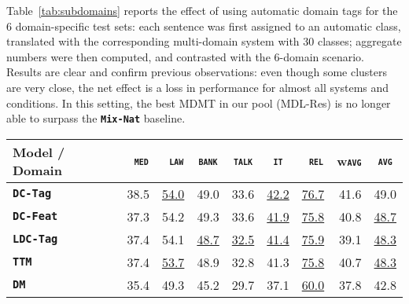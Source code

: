\documentclass[11pt,a4paper]{article}
\newcommand{\fyTodo}[1]{\Todo[FY:]{\textcolor{orange}{#1}}}
\newcommand{\fyDone}[1]{\done[FY]\Todo[FY:]{\textcolor{orange}{#1}}}
\newcommand{\domain}[1]{\texttt{\textsc{#1}}}
\newcommand{\system}[1]{\texttt{\textbf{#1}}}
\newcommand{\SB}[1]{\textbf{#1}}
\newcommand{\SW}[1]{\underline{#1}}
\begin{document}
Table~\ref{tab:subdomains} reports the effect of using automatic domain tags for the 6 domain-specific test sets: each sentence was first assigned to an automatic class, translated with the corresponding multi-domain system with 30 classes; aggregate numbers were then computed, and contrasted with the 6-domain scenario. Results are clear and confirm previous observations: even though some clusters are very close, the net effect is a loss in performance for almost all systems and conditions. In this setting, the best MDMT in our pool (MDL-Res) is no longer able to surpass the \system{Mix-Nat} baseline.%

\begin{table*}[t]
  \centering
  \fyDone{Fix column size}
  \begin{tabular}{|p{3cm}|*{8}{r|}} \hline
    Model / Domain & \multicolumn{1}{c|}{\domain{ med}} & \multicolumn{1}{c|}{\domain{ law}} & \multicolumn{1}{c|}{\domain{bank}} & \multicolumn{1}{c|}{\domain{talk}} & \multicolumn{1}{c|}{\domain{ it }} & \multicolumn{1}{c|}{\domain{ rel}} & \multicolumn{1}{c|}{w\domain{avg}} & \multicolumn{1}{c|}{\domain{avg}} \\ \hline %
    \system{DC-Tag}       & 38.5 & \SW{54.0} & 49.0   & 33.6 & \SW{42.2} & \SW{76.7} & 41.6 & 49.0 \\%
    \system{DC-Feat}      & 37.3  & 54.2 & 49.3   & 33.6 & \SW{41.9} & \SW{75.8} & 40.8 & \SW{48.7}  \\%
    \system{LDC-Tag}     & 37.4   & 54.1 & \SW{48.7} & \SW{32.5} & \SW{41.4} & \SW{75.9} & 39.1 & \SW{48.3}         \\%
    \system{TTM}            & 37.4 & \SW{53.7} & 48.9 & 32.8 & 41.3 & \SW{75.8} & 40.7 & \SW{48.3}   \\%
    \system{DM}             & 35.4 & 49.3  & 45.2 & 29.7 & 37.1 & \SW{60.0} & 37.8 & 42.8 \\ %

\end{tabular}
\end{table*}
\end{document}
